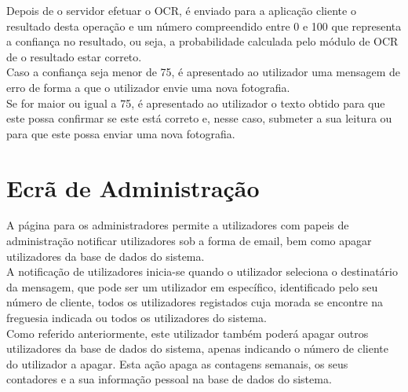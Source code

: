 Depois de o servidor efetuar o OCR, é enviado para a aplicação cliente o resultado desta operação e um número compreendido entre 0 e 100 que representa a confiança no resultado, ou seja, a probabilidade calculada pelo módulo de OCR de o resultado estar correto.\\
Caso a confiança seja menor de 75, é apresentado ao utilizador uma mensagem de erro de forma a que o utilizador envie uma nova fotografia.\\
Se for maior ou igual a 75, é apresentado ao utilizador o texto obtido para que este possa confirmar se este está correto e, nesse caso, submeter a sua leitura ou para que este possa enviar uma nova fotografia.\\

\section{Ecrã de Administração} \label{ecra:admin}
A página para os administradores permite a utilizadores com papeis de administração notificar utilizadores sob a forma de email, bem como apagar utilizadores da base de dados do sistema.\\
A notificação de utilizadores inicia-se quando o utilizador seleciona o destinatário da mensagem, que pode ser um utilizador em específico, identificado pelo seu número de cliente, todos os utilizadores registados cuja morada se encontre na freguesia indicada ou todos os utilizadores do sistema.\\
Como referido anteriormente, este utilizador também poderá apagar outros utilizadores da base de dados do sistema, apenas indicando o número de cliente do utilizador a apagar. Esta ação apaga as contagens semanais, os seus contadores e a sua informação pessoal na base de dados do sistema.




















